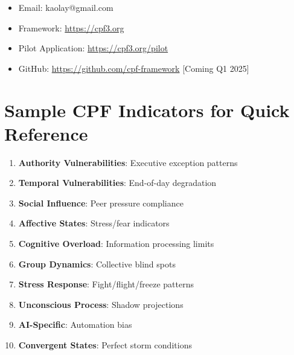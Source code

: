\documentclass[11pt,a4paper]{article}
\begin{document}
\begin{itemize}
\item Email: kaolay@gmail.com
\item Framework: \url{https://cpf3.org}
\item Pilot Application: \url{https://cpf3.org/pilot}
\item GitHub: \url{https://github.com/cpf-framework} [Coming Q1 2025]
\end{itemize}

\appendix

\section{Sample CPF Indicators for Quick Reference}

\begin{enumerate}
\item \textbf{Authority Vulnerabilities}: Executive exception patterns
\item \textbf{Temporal Vulnerabilities}: End-of-day degradation
\item \textbf{Social Influence}: Peer pressure compliance
\item \textbf{Affective States}: Stress/fear indicators
\item \textbf{Cognitive Overload}: Information processing limits
\item \textbf{Group Dynamics}: Collective blind spots
\item \textbf{Stress Response}: Fight/flight/freeze patterns
\item \textbf{Unconscious Process}: Shadow projections
\item \textbf{AI-Specific}: Automation bias
\item \textbf{Convergent States}: Perfect storm conditions
\end{enumerate}
\end{document}
